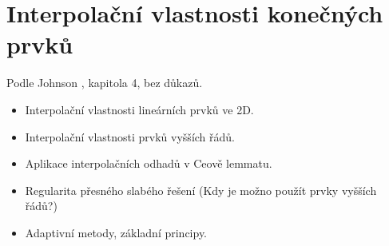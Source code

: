 % 
% 

\section{Interpolační vlastnosti konečných prvků}
Podle Johnson \cite{Johnson}, kapitola 4, bez důkazů.
\begin{itemize}
 \item Interpolační vlastnosti lineárních prvků ve 2D.
 \item Interpolační vlastnosti prvků vyšších řádů.
 \item Aplikace interpolačních odhadů v Ceově lemmatu.
 \item Regularita přesného slabého řešení (Kdy je možno použít prvky vyšších řádů?)
 \item Adaptivní metody, základní principy.
\end{itemize}

% 






